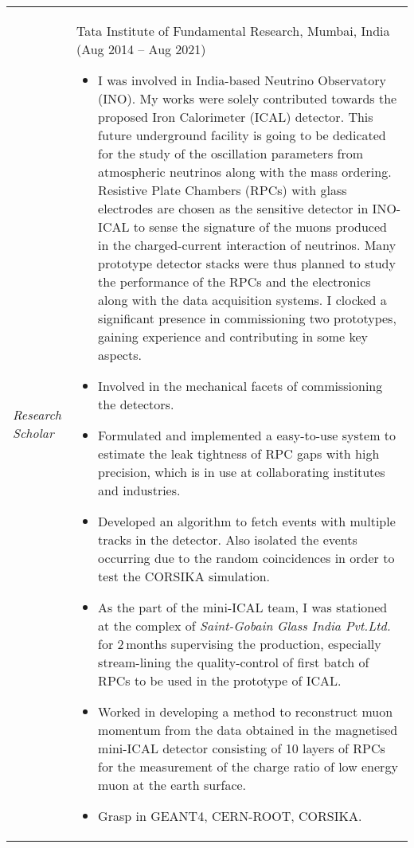 \documentclass[12pt]{article}
\begin{document}
\begin{minipage}{1.05\textwidth}
\vspace{0.4cm}
\begin{tabular}{p{2.5cm} p{14.5cm} }
  {\emph{Research Scholar}} & Tata Institute of Fundamental Research, Mumbai, India (Aug 2014 -- Aug 2021)
  \begin{itemize}
  \item I was involved in India-based Neutrino
    Observatory (INO). My works were solely contributed towards
    the proposed Iron Calorimeter (ICAL) detector. This future
    underground facility is going to be dedicated for the study of the
    oscillation parameters from atmospheric neutrinos along with
    the mass ordering. Resistive Plate Chambers (RPCs) with glass
    electrodes are chosen as the sensitive detector in INO-ICAL to
    sense the signature of the muons produced in the charged-current
    interaction of neutrinos. Many prototype detector stacks were thus
    planned to study the performance of the RPCs and the electronics
    along with the data acquisition systems. I clocked a significant presence
    in commissioning two prototypes, gaining experience and contributing
    in some key aspects.
  \item Involved in the mechanical facets of commissioning the detectors.
  \item Formulated and implemented a easy-to-use system to estimate the
    leak tightness of RPC gaps with high precision, which is in use at
    collaborating institutes and industries.
  \item Developed an algorithm to fetch events with multiple tracks
    in the detector. Also isolated the events occurring due to the
    random coincidences in order to test the CORSIKA simulation.
  \item As the part of the mini-ICAL team, I was stationed at the complex
    of \emph{Saint-Gobain Glass India Pvt.Ltd.} for 2\,months
    supervising the production, especially stream-lining the quality-control
    of first batch of RPCs
    to be used in the prototype of ICAL.
  \item Worked in developing a method to reconstruct muon momentum
    from the data obtained in the magnetised mini-ICAL detector
    consisting of 10 layers of RPCs for the measurement of the charge
    ratio of low energy muon at the earth surface.
  \item Grasp in GEANT4, CERN-ROOT, CORSIKA.
  \end{itemize}

\end{tabular}
\end{minipage}
\end{document}
